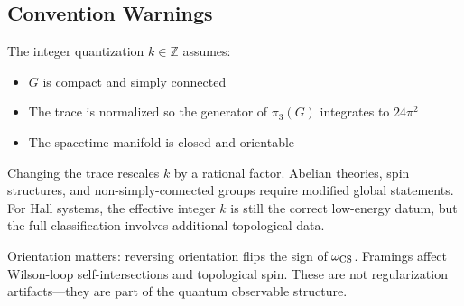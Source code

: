 \subsection{Convention Warnings}

The integer quantization $k\in\mathbb Z$ assumes:
\begin{itemize}
  \item $G$ is compact and simply connected
  \item The trace is normalized so the generator of $\pi_3(G)$ integrates to $24\pi^2$
  \item The spacetime manifold is closed and orientable
\end{itemize}
Changing the trace rescales $k$ by a rational factor. Abelian theories, spin structures, and non-simply-connected groups require modified global statements. For Hall systems, the effective integer $k$ is still the correct low-energy datum, but the full classification involves additional topological data.

Orientation matters: reversing orientation flips the sign of $\omega_{\operatorname{CS}}$. Framings affect Wilson-loop self-intersections and topological spin. These are not regularization artifacts—they are part of the quantum observable structure.
